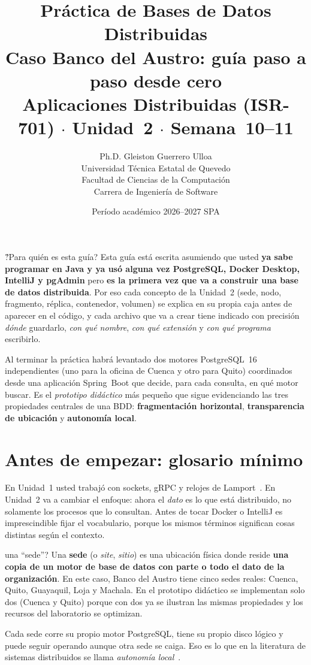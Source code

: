 \documentclass[11pt,a4paper]{article}
\title{
    \vspace{-1.2cm}
    \color{uteqBlue}\textbf{Pr\'actica de Bases de Datos Distribuidas}\\[0.15cm]
    \color{uteqMid}\large Caso Banco del Austro: gu\'ia paso a paso desde cero\\[0.3cm]
    \color{uteqGray}\normalsize
    Aplicaciones Distribuidas (ISR-701) $\cdot$ Unidad~2 $\cdot$ Semana~10--11
}
\author{
    \color{uteqGray}\normalsize
    Ph.D. Gleiston Guerrero Ulloa\\
    Universidad T\'ecnica Estatal de Quevedo\\
    Facultad de Ciencias de la Computaci\'on\\
    Carrera de Ingenier\'ia de Software
}
\date{\color{uteqGray}\small Per\'iodo acad\'emico 2026--2027 SPA}
\begin{document}
\maketitle
\thispagestyle{fancy}

\begin{casobox}{\'?Para qui\'en es esta gu\'ia?}
Esta gu\'ia est\'a escrita asumiendo que usted \textbf{ya sabe programar en Java y ya us\'o alguna vez PostgreSQL, Docker Desktop, IntelliJ y pgAdmin} pero \textbf{es la primera vez que va a construir una base de datos distribuida}. Por eso cada concepto de la Unidad~2 (sede, nodo, fragmento, r\'eplica, contenedor, volumen) se explica en su propia caja antes de aparecer en el c\'odigo, y cada archivo que va a crear tiene indicado con precisi\'on \emph{d\'onde} guardarlo, \emph{con qu\'e nombre}, \emph{con qu\'e extensi\'on} y \emph{con qu\'e programa} escribirlo.

Al terminar la pr\'actica habr\'a levantado dos motores PostgreSQL~16 independientes (uno para la oficina de Cuenca y otro para Quito) coordinados desde una aplicaci\'on Spring~Boot que decide, para cada consulta, en qu\'e motor buscar. Es el \emph{prototipo did\'actico} m\'as peque\~no que sigue evidenciando las tres propiedades centrales de una BDD: \textbf{fragmentaci\'on horizontal}, \textbf{transparencia de ubicaci\'on} y \textbf{autonom\'ia local}.
\end{casobox}

\tableofcontents
\clearpage

\section{Antes de empezar: glosario m\'inimo}

En Unidad~1 usted trabaj\'o con sockets, gRPC y relojes de Lamport~\cite{Lamport1978Time}. En Unidad~2 va a cambiar el enfoque: ahora el \emph{dato} es lo que est\'a distribuido, no solamente los procesos que lo consultan. Antes de tocar Docker o IntelliJ es imprescindible fijar el vocabulario, porque los mismos t\'erminos significan cosas distintas seg\'un el contexto.

\begin{conceptobox}{una ``sede''?}
Una \textbf{sede} (o \emph{site}, \emph{sitio}) es una ubicaci\'on f\'isica donde reside \textbf{una copia de un motor de base de datos con parte o todo el dato de la organizaci\'on}. En este caso, Banco del Austro tiene cinco sedes reales: Cuenca, Quito, Guayaquil, Loja y Machala. En el prototipo did\'actico se implementan solo dos (Cuenca y Quito) porque con dos ya se ilustran las mismas propiedades y los recursos del laboratorio se optimizan.

Cada sede corre su propio motor PostgreSQL, tiene su propio disco l\'ogico y puede seguir operando aunque otra sede se caiga. Eso es lo que en la literatura de sistemas distribuidos se llama \emph{autonom\'ia local}~\cite{Ozsu2020Principles}.
\end{conceptobox}
\end{document}

